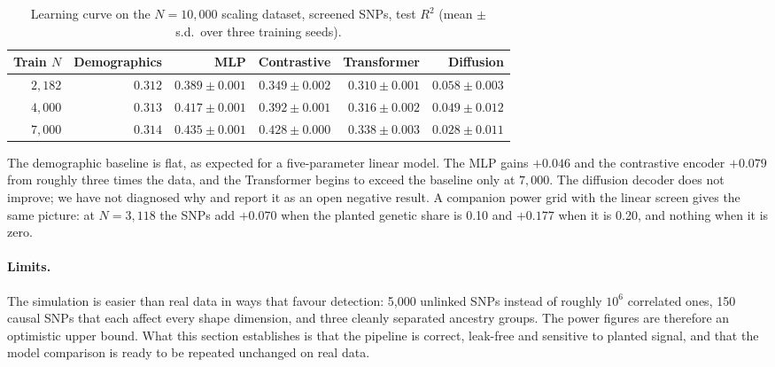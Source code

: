 \begin{table}[t]
\centering
\caption{Learning curve on the $N=10{,}000$ scaling dataset, screened SNPs,
test $R^2$ (mean $\pm$ s.d.\ over three training seeds).}
\label{tab:rq5-scaling}
\begin{tabular}{rrrrrr}
\toprule
Train $N$ & Demographics & MLP & Contrastive & Transformer & Diffusion \\
\midrule
$2{,}182$ & $0.312$ & $0.389\pm0.001$ & $0.349\pm0.002$ & $0.310\pm0.001$ & $0.058\pm0.003$ \\
$4{,}000$ & $0.313$ & $0.417\pm0.001$ & $0.392\pm0.001$ & $0.316\pm0.002$ & $0.049\pm0.012$ \\
$7{,}000$ & $0.314$ & $0.435\pm0.001$ & $0.428\pm0.000$ & $0.338\pm0.003$ & $0.028\pm0.011$ \\
\bottomrule
\end{tabular}
\end{table}

The demographic baseline is flat, as expected for a five-parameter linear model.
The MLP gains $+0.046$ and the contrastive encoder $+0.079$ from roughly three
times the data, and the Transformer begins to exceed the baseline only at
$7{,}000$. The diffusion decoder does not improve; we have not diagnosed why and
report it as an open negative result. A companion power grid with the linear
screen gives the same picture: at $N=3{,}118$ the SNPs add $+0.070$ when the
planted genetic share is 0.10 and $+0.177$ when it is 0.20, and nothing when it
is zero.

\paragraph{Limits.}
The simulation is easier than real data in ways that favour detection: 5{,}000
unlinked SNPs instead of roughly $10^6$ correlated ones, 150 causal SNPs that
each affect every shape dimension, and three cleanly separated ancestry groups.
The power figures are therefore an optimistic upper bound. What this section
establishes is that the pipeline is correct, leak-free and sensitive to planted
signal, and that the model comparison is ready to be repeated unchanged on real
data.
